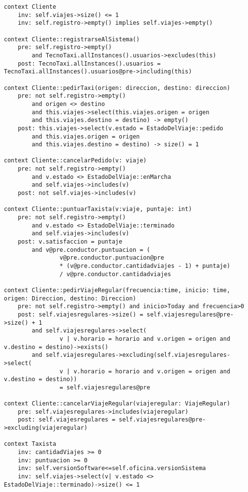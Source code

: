 \lstset{language=OCL}
\begin{lstlisting}[frame=single]
context Cliente
	inv: self.viajes->size() <= 1
	inv: self.registro->empty() implies self.viajes->empty()

context Cliente::registrarseAlSistema()
	pre: self.registro->empty()
		and TecnoTaxi.allInstances().usuarios->excludes(this)
	post: TecnoTaxi.allInstances().usuarios = TecnoTaxi.allInstances().usuarios@pre->including(this)

context Cliente::pedirTaxi(origen: direccion, destino: direccion)
	pre: not self.registro->empty()
		and origen <> destino
		and this.viajes->select(this.viajes.origen = origen
		and this.viajes.destino = destino) -> empty()
	post: this.viajes->select(v.estado = EstadoDelViaje::pedido
		and this.viajes.origen = origen
		and this.viajes.destino = destino) -> size() = 1

context Cliente::cancelarPedido(v: viaje)
	pre: not self.registro->empty()
		and v.estado <> EstadoDelViaje::enMarcha
		and self.viajes->includes(v)
	post: not self.viajes->includes(v)

context Cliente::puntuarTaxista(v:viaje, puntaje: int)
	pre: not self.registro->empty()
		and v.estado <> EstadoDelViaje::terminado
		and self.viajes->includes(v)
	post: v.satisfaccion = puntaje
		and v@pre.conductor.puntuacion = (
				v@pre.conductor.puntuacion@pre
				* (v@pre.conductor.cantidadviajes - 1) + puntaje)
				/ v@pre.conductor.cantidadviajes
	
context Cliente::pedirViajeRegular(frecuencia:time, inicio: time, origen: Direccion, destino: Direccion)
	pre: not self.registro->empty() and inicio>Today and frecuencia>0
	post: self.viajesregulares->size() = self.viajesregulares@pre->size() + 1
		and self.viajesregulares->select(
				v | v.horario = horario and v.origen = origen and v.destino = destino)->exists()
		and self.viajesregulares->excluding(self.viajesregulares->select(
				v | v.horario = horario and v.origen = origen and v.destino = destino))
				= self.viajesregulares@pre

context Cliente::cancelarViajeRegular(viajeregular: ViajeRegular)
	pre: self.viajesregulares->includes(viajeregular)
	post: self.viajesregulares = self.viajesregulares@pre->excluding(viajeregular)

context Taxista
	inv: cantidadViajes >= 0
	inv: puntuacion >= 0
	inv: self.versionSoftware<=self.oficina.versionSistema
	inv: self.viajes->select(v| v.estado <> EstadoDelViaje::terminado)->size() <= 1


\end{lstlisting}
